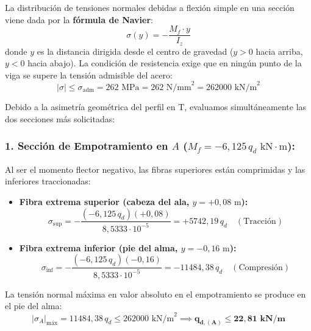 
La distribución de tensiones normales debidas a flexión simple en una sección viene dada por la \textbf{fórmula de Navier}:
\begin{equation}
    \sigma(y) = -\frac{M_f \cdot y}{I_z}
\end{equation}
donde $y$ es la distancia dirigida desde el centro de gravedad ($y > 0$ hacia arriba, $y < 0$ hacia abajo).
La condición de resistencia exige que en ningún punto de la viga se supere la tensión admisible del acero:
\begin{equation}
    |\sigma| \leq \sigma_{\text{adm}} = 262\text{ MPa} = 262\text{ N/mm}^2 = 262000\text{ kN/m}^2
\end{equation}

Debido a la asimetría geométrica del perfil en T, evaluamos simultáneamente las dos secciones más solicitadas:

\subsubsection*{1. Sección de Empotramiento en $A$ ($M_f = -6{,}125\,q_d\text{ kN}\cdot\text{m}$):}
Al ser el momento flector negativo, las fibras superiores están comprimidas y las inferiores traccionadas:
\begin{itemize}
    \item \textbf{Fibra extrema superior (cabeza del ala, $y = +0{,}08\text{ m}$):}
          \begin{equation}
              \sigma_{\text{sup}} = -\frac{(-6{,}125\,q_d)(+0{,}08)}{8{,}5333 \cdot 10^{-5}} = +5742{,}19\,q_d \quad (\text{Tracción})
          \end{equation}
    \item \textbf{Fibra extrema inferior (pie del alma, $y = -0{,}16\text{ m}$):}
          \begin{equation}
              \sigma_{\text{inf}} = -\frac{(-6{,}125\,q_d)(-0{,}16)}{8{,}5333 \cdot 10^{-5}} = -11484{,}38\,q_d \quad (\text{Compresión})
          \end{equation}
\end{itemize}
La tensión normal máxima en valor absoluto en el empotramiento se produce en el pie del alma:
\begin{equation}
    |\sigma_A|_{\text{máx}} = 11484{,}38\,q_d \leq 262000\text{ kN/m}^2 \implies \mathbf{q_{d,(A)} \leq 22{,}81\text{ kN/m}}
\end{equation}

